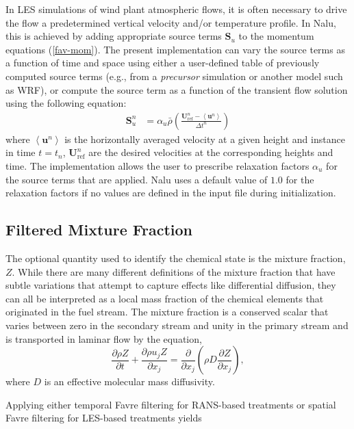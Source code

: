 In LES simulations of wind plant atmospheric flows, it is often necessary to
drive the flow a predetermined vertical velocity and/or temperature profile. In
Nalu, this is achieved by adding appropriate source terms $\mathbf{S}_u$ to the
momentum equations (\ref{fav-mom}). The present implementation can vary the
source terms as a function of time and space using either a user-defined table
of previously computed source terms (e.g., from a \emph{precursor} simulation or
another model such as WRF), or compute the source term as a function of the
transient flow solution using the following equation:
\begin{align}
  \label{eq:abl-mom-source}
 \mathbf{S}_u^n &= \alpha_u \bar{\rho} \left( \frac{\mathbf{U}^n_\mathrm{ref} -
                  \left<\mathbf{u}^n\right>}{\Delta t^n}\right)
\end{align}
where $\left<\mathbf{u}^n\right>$ is the horizontally averaged velocity at a
given height and instance in time $t=t_n$, $\mathbf{U}^n_\mathrm{ref}$ are the desired
velocities at the corresponding heights and time. The implementation allows the
user to prescribe relaxation factors $\alpha_u$ for the source terms that are
applied. Nalu uses a default value of $1.0$ for the relaxation factors if no
values are defined in the input file during initialization.

\subsection{Filtered Mixture Fraction} \label{sec:filtered_Z}

The optional quantity used to identify the chemical state is the mixture 
fraction, $Z$.  While there are many 
different definitions of the mixture fraction that have subtle variations
that attempt to capture effects like differential diffusion, they can all 
be interpreted as a local mass fraction of the chemical elements that
originated in the fuel stream.  The mixture fraction is a
conserved scalar that varies between zero in the secondary stream and unity in the
primary stream and is transported in laminar flow by the equation,
%
\begin{equation}
\frac{\partial \rho Z}{\partial t}
  + \frac{ \partial \rho u_j Z }{ \partial x_j}
  = \frac{\partial}{\partial x_j} \left( \rho D \frac{\partial Z}{\partial x_j}
    \right),  \label{eqn:lam_Z}
\end{equation}
%
where $D$ is an effective molecular mass diffusivity.

Applying either temporal Favre filtering for RANS-based treatments or 
spatial Favre filtering for LES-based treatments yields


